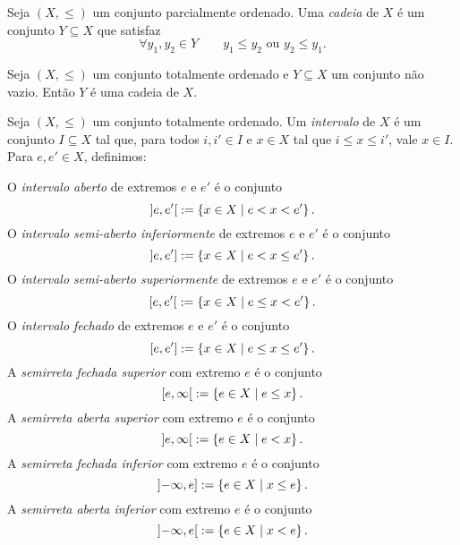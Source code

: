 \begin{definition}
	Seja $(X,\leq)$ um conjunto parcialmente ordenado. Uma \emph{cadeia} de $X$ é um conjunto $Y \subseteq X$ que satisfaz
	\begin{equation*}
	\forall y_1,y_2 \in Y \qquad y_1 \leq y_2 \text{\ \ ou\ \ } y_2 \leq y_1.
	\end{equation*}
\end{definition}

\begin{exercise}
	Seja $(X,\leq)$ um conjunto totalmente ordenado e $Y \subseteq X$ um conjunto não vazio. Então $Y$ é uma cadeia de $X$.
\end{exercise}

\begin{definition}
	Seja $(X,\leq)$ um conjunto totalmente ordenado. Um \emph{intervalo} de $X$ é um conjunto $I \subseteq X$ tal que, para todos $i,i' \in I$ e $x \in X$ tal que $i \leq x \leq i'$, vale $x \in I$. Para $e,e' \in X$, definimos:
	
	O \emph{intervalo aberto} de extremos $e$ e $e'$ é o conjunto
		\begin{equation*}
			\left]{e},{e'}\right[ := \left\{{x \in X}\;\middle\vert\;{e < x < e'}\right\}.
		\end{equation*}
	O \emph{intervalo semi-aberto inferiormente} de extremos $e$ e $e'$ é o conjunto
		\begin{equation*}
			\left]{e},{e'}\right] := \left\{{x \in X}\;\middle\vert\;{e < x \leq e'}\right\}.
		\end{equation*}
	O \emph{intervalo semi-aberto superiormente} de extremos $e$ e $e'$ é o conjunto
		\begin{equation*}
			\left[{e},{e'}\right[ := \left\{{x \in X}\;\middle\vert\;{e \leq x < e'}\right\}.
		\end{equation*}
	O \emph{intervalo fechado} de extremos $e$ e $e'$ é o conjunto
		\begin{equation*}
			\left[{e},{e'}\right] := \left\{{x \in X}\;\middle\vert\;{e \leq x \leq e'}\right\}.
		\end{equation*}
	A \emph{semirreta fechada superior} com extremo $e$ é o conjunto
		\begin{equation*}
			\left[{e},{\infty}\right[ := \left\{{e \in X}\;\middle\vert\;{e \leq x}\right\}.
		\end{equation*}
	A \emph{semirreta aberta superior} com extremo $e$ é o conjunto
		\begin{equation*}
			\left]{e},{\infty}\right[ := \left\{{e \in X}\;\middle\vert\;{e < x}\right\}.
		\end{equation*}
	A \emph{semirreta fechada inferior} com extremo $e$ é o conjunto
		\begin{equation*}
			\left]{-\infty},{e}\right] := \left\{{e \in X}\;\middle\vert\;{x \leq e}\right\}.
		\end{equation*}
	A \emph{semirreta aberta inferior} com extremo $e$ é o conjunto
		\begin{equation*}
			\left]{-\infty},{e}\right[ := \left\{{e \in X}\;\middle\vert\;{x < e}\right\}.
		\end{equation*}
\end{definition}

